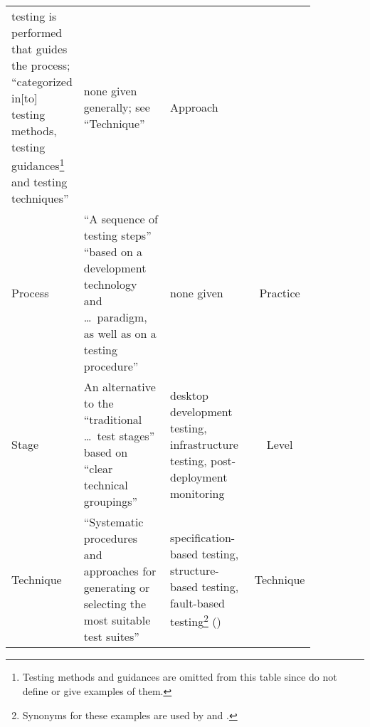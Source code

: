 \begin{paperTable}
\begin{minipage}{\linewidth}
\begin{tabular}{|>{\centering}m{0.08\linewidth}|m{0.43\linewidth}|m{0.34\linewidth}|c|}
            testing is performed that guides the process; ``categorized in[to] testing methods,
            testing guidances\footnote{Testing methods and guidances are omitted from this table
                since \citet{BarbosaEtAl2006} do not define or give examples of them.} and testing techniques''
            \citep[p.~3]{BarbosaEtAl2006}          & none given
            generally; see ``Technique''           & Approach                                                               \\
            Process                                & ``A sequence of
            testing steps'' \citep[p.~2]{BarbosaEtAl2006} ``based on a development technology and \dots\
            paradigm, as well as on a testing procedure''
            \citetext{p.~3}                        & none given                   & Practice                                \\
            Stage                                  & An
            alternative to the ``traditional \dots\ test stages'' %
            based on ``clear technical groupings''
            \citep[p.~13]{Gerrard2000a}            & desktop development testing,
            infrastructure testing,
            post-deployment monitoring
            \citep[p.~13]{Gerrard2000a}            & Level                                                                  \\
            Technique                              & ``Systematic
            procedures and approaches for generating or selecting the most suitable test
            suites'' \citep[p.~5\=/10]{SWEBOK2024} & specification-based testing,
            structure-based testing, fault-based testing\footnote{Synonyms for
                these examples are used by \citet[p.~3; OG Mathur, 2012]{SouzaEtAl2017}
                and \citet[p.~3]{BarbosaEtAl2006}.}
            (\citealp[pp.~5\=/10, 5\=/13 to 5\=/15]{SWEBOK2024})
                                                   & Technique                                                              \\
            \hline
        \end{tabular}
    \end{minipage}
\end{paperTable}